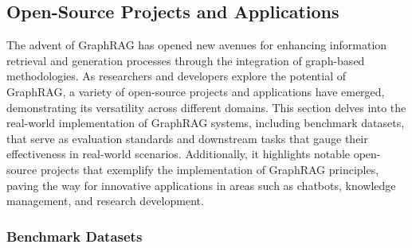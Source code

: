 \documentclass[lettersize,journal]{IEEEtran}
\begin{document}


\appendix



\subsection{Open-Source Projects and Applications}\label{sec:opensource}

The advent of GraphRAG has opened new avenues for enhancing information retrieval and generation processes through the integration of graph-based methodologies. As researchers and developers explore the potential of GraphRAG, a variety of open-source projects and applications have emerged, demonstrating its versatility across different domains. This section delves into the real-world implementation of GraphRAG systems, including benchmark datasets,  that serve as evaluation standards and downstream tasks that gauge their effectiveness in real-world scenarios. Additionally, it highlights notable open-source projects that exemplify the implementation of GraphRAG principles, paving the way for innovative applications in areas such as chatbots, knowledge management, and research development.

\subsubsection{Benchmark Datasets}
\end{document}
